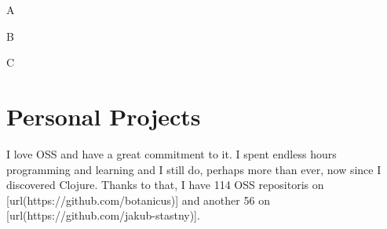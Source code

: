 \startitemize[before={}, after={}]
  \item A
  \item B
  \item C
\stopitemize


\blank \section{Personal Projects}
I love OSS and have a great commitment to it. I spent endless hours programming and learning and I still do, perhaps more than ever, now since I discovered Clojure. Thanks to that, I have 114 OSS repositoris on [url(https://github.com/botanicus)] and another 56 on [url(https://github.com/jakub-stastny)].



